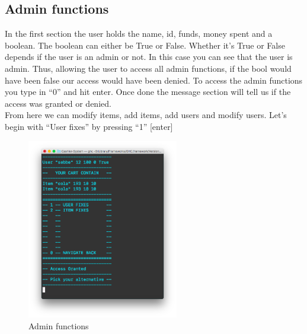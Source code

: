 \documentclass[11pt]{article}
\begin{document}
\subsection{Admin functions}
In the first section the user holds the name, id, funds, money spent and a boolean. The boolean can either be True or False. Whether it’s True or False depends if the user is an admin or not. In this case you can see that the user is admin. Thus, allowing the user to access all admin functions, if the bool would have been false our access would have been denied. To access the admin functions you type in “0” and hit enter. Once done the message section will tell us if the access was granted or denied.
\\
From here we can modify items, add items, add users and modify users. Let’s begin with “User fixes” by pressing “1” [enter]
\\
\begin{figure}[h!]
  \includegraphics[width=250px]{interface6.png}
  \caption{Admin functions}
\end{figure}
\\
\end{document}
